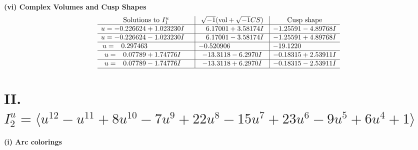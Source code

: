 \documentclass[1p]{elsarticle_modified}
\theoremstyle{definition}
\newcommand{\I}{\sqrt{-1}}
\begin{document}
\newpage\flushleft \textbf{(vi) Complex Volumes and Cusp Shapes}
$$\begin{array}{c|c|c}  
\text{Solutions to }I^u_{1}& \I (\text{vol} + \sqrt{-1}CS) & \text{Cusp shape}\\
 \hline 
\begin{aligned}
u &= -0.226624 + 1.023230 I\end{aligned}
 & \phantom{-}6.17001 + 3.58174 I & -1.25591 - 4.89768 I \\ \hline\begin{aligned}
u &= -0.226624 - 1.023230 I\end{aligned}
 & \phantom{-}6.17001 - 3.58174 I & -1.25591 + 4.89768 I \\ \hline\begin{aligned}
u &= \phantom{-}0.297463\phantom{ +0.000000I}\end{aligned}
 & -0.520906\phantom{ +0.000000I} & -19.1220\phantom{ +0.000000I} \\ \hline\begin{aligned}
u &= \phantom{-}0.07789 + 1.74776 I\end{aligned}
 & -13.3118 - 6.2970 I & -0.18315 + 2.53911 I \\ \hline\begin{aligned}
u &= \phantom{-}0.07789 - 1.74776 I\end{aligned}
 & -13.3118 + 6.2970 I & -0.18315 - 2.53911 I\\
 \hline 
 \end{array}$$\newpage\newpage\renewcommand{\arraystretch}{1}
\centering \section*{II. $I^u_{2}= \langle u^{12}- u^{11}+8 u^{10}-7 u^9+22 u^8-15 u^7+23 u^6-9 u^5+6 u^4+1 \rangle$}
\flushleft \textbf{(i) Arc colorings}\\
\end{document}
